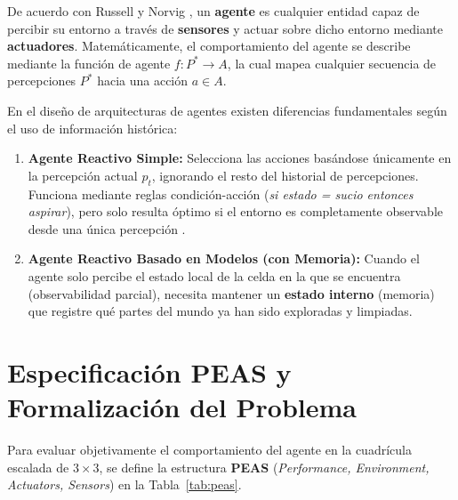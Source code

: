 \documentclass[runningheads]{llncs}
\begin{document}
De acuerdo con Russell y Norvig \cite{russell2021}, un \textbf{agente} es cualquier entidad capaz de percibir su entorno a través de \textbf{sensores} y actuar sobre dicho entorno mediante \textbf{actuadores}. Matemáticamente, el comportamiento del agente se describe mediante la función de agente $f: P^* \rightarrow A$, la cual mapea cualquier secuencia de percepciones $P^*$ hacia una acción $a \in A$.

En el diseño de arquitecturas de agentes existen diferencias fundamentales según el uso de información histórica:
\begin{enumerate}
    \item \textbf{Agente Reactivo Simple:} Selecciona las acciones basándose únicamente en la percepción actual $p_t$, ignorando el resto del historial de percepciones. Funciona mediante reglas condición-acción (\textit{si estado = sucio entonces aspirar}), pero solo resulta óptimo si el entorno es completamente observable desde una única percepción \cite{russell2021}.
    \item \textbf{Agente Reactivo Basado en Modelos (con Memoria):} Cuando el agente solo percibe el estado local de la celda en la que se encuentra (observabilidad parcial), necesita mantener un \textbf{estado interno} (memoria) que registre qué partes del mundo ya han sido exploradas y limpiadas.
\end{enumerate}

\section{Especificación PEAS y Formalización del Problema}

Para evaluar objetivamente el comportamiento del agente en la cuadrícula escalada de $3\times 3$, se define la estructura \textbf{PEAS} (\textit{Performance, Environment, Actuators, Sensors}) en la Tabla~\ref{tab:peas}.
\end{document}
